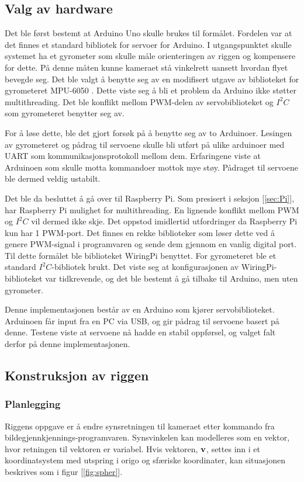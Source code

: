 \subsection{Valg av hardware}

Det ble først bestemt at Arduino Uno skulle brukes til formålet. Fordelen var at det finnes et standard bibliotek for servoer for Arduino. I utgangspunktet skulle systemet ha et gyrometer som skulle måle orienteringen av riggen og kompensere for dette. På denne måten kunne kameraet stå vinkelrett uansett hvordan flyet bevegde seg. Det ble valgt å benytte seg av en modifisert utgave av biblioteket for gyrometeret MPU-6050 \cite{GyroLib}. Dette viste seg å bli et problem da Arduino ikke støtter multithreading. Det ble konflikt mellom PWM-delen av servobiblioteket og $I^2C$ \cite{i2c} som gyrometeret benytter seg av.

For å løse dette, ble det gjort forsøk på å benytte seg av to Arduinoer. Lesingen av gyrometeret og pådrag til servoene skulle bli utført på ulike arduinoer med UART som kommunikasjonsprotokoll mellom dem. Erfaringene viste at Arduinoen som skulle motta kommandoer mottok mye støy. Pådraget til servoene ble dermed veldig ustabilt.

Det ble da besluttet å gå over til Raspberry Pi. Som presisert i seksjon [\ref{sec:Pi}], har Raspberry Pi mulighet for multithreading. En lignende konflikt mellom PWM og $I^2C$ vil dermed ikke skje. Det oppstod imidlertid utfordringer da Raspberry Pi kun har 1 PWM-port. Det finnes en rekke biblioteker som løser dette ved å genere PWM-signal i programvaren og sende dem gjennom en vanlig digital port. Til dette formålet ble biblioteket WiringPi \cite{WirPi} benyttet. For gyrometeret ble et standard $I^2C$-bibliotek brukt. Det viste seg at konfigurasjonen av WiringPi-biblioteket var tidkrevende, og det ble bestemt å gå tilbake til Arduino, men uten gyrometer.

Denne implementasjonen består av en Arduino som kjører servobiblioteket. Arduinoen får input fra en PC via USB, og gir pådrag til servoene basert på denne. Testene viste at servoene nå hadde en stabil oppførsel, og valget falt derfor på denne implementasjonen.

\subsection{Konstruksjon av riggen}

\subsubsection{Planlegging}
Riggens oppgave er å endre synsretningen til kameraet etter kommando fra bildegjennkjennings-programvaren. Synsvinkelen kan modelleres som en vektor, hvor retningen til vektoren er variabel. Hvis vektoren, $\bf{v}$, settes inn i et koordinatsystem med utspring i origo og sfæriske koordinater, kan situasjonen beskrives som i figur [\ref{fig:spher}].

